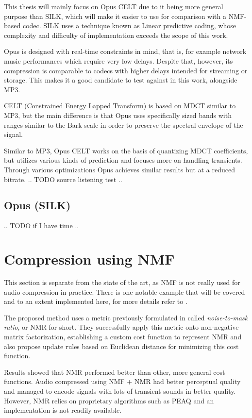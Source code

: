 This thesis will mainly focus on Opus CELT due to it being more general purpose than SILK, which will make it easier to use for comparison with a NMF-based codec. SILK uses a technique known as Linear predictive coding, whose complexity and difficulty of implementation exceeds the scope of this work.

Opus is designed with real-time constraints in mind, that is, for example network music performances which require very low delays. Despite that, however, its compression is comparable to codecs with higher delays intended for streaming or storage. This makes it a good candidate to test against in this work, alongside MP3.

CELT (Constrained Energy Lapped Transform) is based on MDCT similar to MP3, but the main difference is that Opus uses specifically sized bands with ranges similar to the Bark scale in order to preserve the spectral envelope of the signal.

Similar to MP3, Opus CELT works on the basis of quantizing MDCT coefficients, but utilizes various kinds of prediction and focuses more on handling transients. Through various optimizations Opus achieves similar results but at a reduced bitrate.
.. TODO source listening test ..

\subsection{Opus (SILK)}
.. TODO if I have time ..

\section{Compression using NMF}
This section is separate from the state of the art, as NMF is not really used for audio compression in practice. There is one notable example that will be covered and to an extent implemented here, for more details refer to \cite{nikunen_2010}.

The proposed method uses a metric previously formulated in \cite{Nikunen2010NoisetomaskRM} called \emph{noise-to-mask ratio}, or NMR for short. They successfully apply this metric onto non-negative matrix factorization, establishing a custom cost function to represent NMR and also propose update rules based on Euclidean distance for minimizing this cost function.

Results showed that NMR performed better than other, more general cost functions. Audio compressed using NMF + NMR had better perceptual quality and managed to encode signals with lots of transient sounds in better quality. However, NMR relies on proprietary algorithms such as PEAQ \cite{peaq_2006} and an implementation is not readily available.

